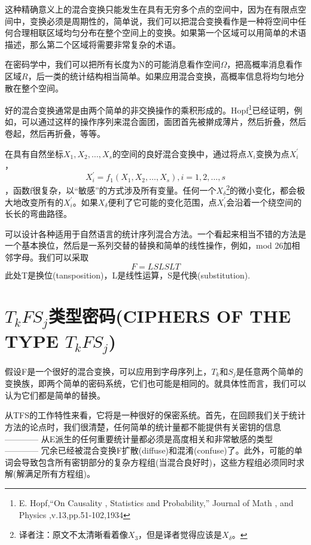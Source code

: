 \documentclass[]{article}
\begin{document}
这种精确意义上的混合变换只能发生在具有无穷多个点的空间中，因为在有限点空间中，变换必须是周期性的，简单说，我们可以把混合变换看作是一种将空间中任何合理相联区域均匀分布在整个空间上的变换。如果第一个区域可以用简单的术语描述，那么第二个区域将需要非常复杂的术语。

在密码学中，我们可以把所有长度为N的可能消息看作空间$\Omega$，把高概率消息看作区域$R$，后一类的统计结构相当简单。如果应用混合变换，高概率信息将均匀地分散在整个空间。

好的混合变换通常是由两个简单的非交换操作的乘积形成的。Hopf\footnote{E. Hopf,“On Causality , Statistics and Probability,” Journal of Math , and Physics ,v.13,pp.51-102,1934 }已经证明，例如，可以通过这样的操作序列来混合面团，面团首先被擀成薄片，然后折叠，然后卷起，然后再折叠，等等。

在具有自然坐标$X_1,X_2,\ldots,X_s$的空间的良好混合变换中，通过将点$X_i$变换为点$X_i^{'}$，
\[X_i^{'}=f_1(X_1,X_2,\ldots,X_s),i=1,2,\ldots,s\]
，函数f很复杂，以“敏感”的方式涉及所有变量。任何一个$X_\delta$\footnote{译者注：原文不太清晰看着像$X_3$，但是译者觉得应该是$X_\delta$。}的微小变化，都会极大地改变所有的$X_i^{'}$。如果$X_\delta$便利了它可能的变化范围，点$X_i^{'}$会沿着一个绕空间的长长的弯曲路径。

可以设计各种适用于自然语言的统计序列混合方法。一个看起来相当不错的方法是一个基本换位，然后是一系列交替的替换和简单的线性操作，例如，mod 26加相邻字母。我们可以采取
\[F=LSLSLT\]
此处T是换位(tansposition)，L是线性运算，S是代换(substitution).

\newpage
%   
%

\section{$T_k F S_j$类型密码(CIPHERS OF THE TYPE $T_k F S_j$)}

假设F是一个很好的混合变换，可以应用到字母序列上，$T_k$和$S_j$是任意两个简单的变换族，即两个简单的密码系统，它们也可能是相同的。就具体性而言，我们可以认为它们都是简单的替换。

从TFS的工作特性来看，它将是一种很好的保密系统。首先，在回顾我们关于统计方法的论点时，我们很清楚，任何简单的统计量都不能提供有关密钥的信息 ———— 从E派生的任何重要统计量都必须是高度相关和非常敏感的类型 ———— 冗余已经被混合变换F扩散(diffuse)和混淆(confuse)了。此外，可能的单词会导致包含所有密钥部分的复杂方程组(当混合良好时)，这些方程组必须同时求解(解满足所有方程组)。
\end{document}
